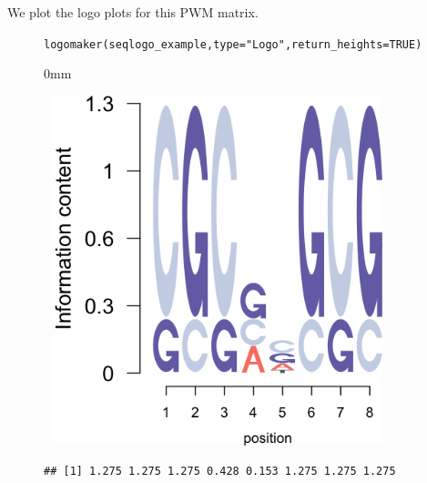 \documentclass[12pt]{article}\usepackage[]{graphicx}\usepackage[usenames,dvipsnames]{color}
\newcommand{\hlnum}[1]{\textcolor[rgb]{0.816,0.125,0.439}{#1}}%
\newcommand{\hlstr}[1]{\textcolor[rgb]{0.251,0.627,0.251}{#1}}%
\newcommand{\hlstd}[1]{\textcolor[rgb]{0.251,0.251,0.251}{#1}}%
\newcommand{\hlkwc}[1]{\textcolor[rgb]{0.251,0.251,0.251}{#1}}%
\newcommand{\hlkwd}[1]{\textcolor[rgb]{0.878,0.439,0.125}{#1}}%
\newenvironment{knitrout}{}{} %
\begin{document}
We plot the logo plots for this PWM matrix.


\begin{figure}[h]
\begin{center}
\begin{knitrout}
\color{fgcolor}\begin{kframe}
\begin{alltt}
\hlkwd{logomaker}\hlstd{(seqlogo_example,} \hlkwc{type} \hlstd{=} \hlstr{"Logo"}\hlstd{,} \hlkwc{return_heights} \hlstd{=} \hlnum{TRUE}\hlstd{)}
\end{alltt}
\end{kframe}\begin{adjustwidth}{\fltoffset}{0mm}

\includegraphics[width=4in,height=4in]{figure/logo_3-1} \hfill{}

\end{adjustwidth}\begin{kframe}\begin{verbatim}
## [1] 1.275 1.275 1.275 0.428 0.153 1.275 1.275 1.275
\end{verbatim}
\end{kframe}
\end{knitrout}
\end{center}
\end{figure}
\end{document}
